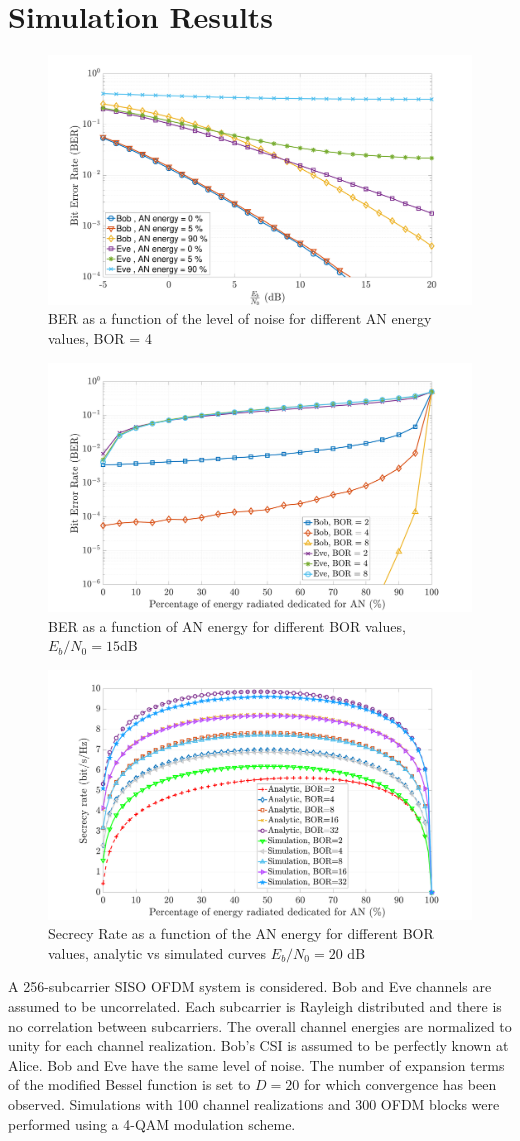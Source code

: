 \documentclass[a4paper,11pt]{article}
\begin{document}
\section{Simulation Results}
\begin{figure}[t]
    \centering
    \centerline{\includegraphics[width = .4\textwidth]{img/ber_ebno_alpha_bor_globcom.pdf}}
    \caption{BER as a function of the level of noise for different AN energy values, BOR = 4}
    \label{fig:ber_ebno}
\end{figure}

\begin{figure}[t]
    \centering
    \centerline{\includegraphics[width = .4\textwidth]{img/ber_alpha_bor_ebno_globcom.pdf}}
    \caption{BER as a function of AN energy for different BOR values, $E_b/N_0 = 15$dB}
    \label{fig:ber_alpha}
\end{figure}


\begin{figure}[t]
    \centering
    \centerline{\includegraphics[width = .43\textwidth]{img/ICNC_simu_anal.pdf}}
    \caption{Secrecy Rate as a function of the AN energy for different BOR values, analytic vs simulated curves $E_b/N_0=20$ dB }
    \label{fig:secrecy_alpha_bor}
\end{figure}

\label{sec:result}
A 256-subcarrier SISO OFDM system is considered. Bob and Eve channels are assumed to be uncorrelated. Each subcarrier is Rayleigh distributed and there is no correlation between subcarriers. The overall channel energies are normalized to unity for each channel realization. Bob's CSI is assumed to be perfectly known at Alice. Bob and Eve have the same level of noise. The number of expansion terms of the modified Bessel function is set to $D=20$ for which convergence has been observed. Simulations with 100 channel realizations and 300 OFDM blocks were performed using a 4-QAM modulation scheme. 
\end{document}
